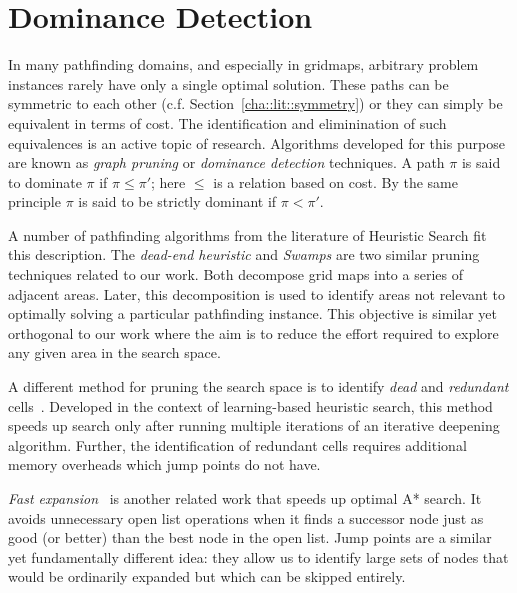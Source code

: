 \section{Dominance Detection}
\label{cha::lit::dominance}
In many pathfinding domains, and especially in gridmaps, arbitrary problem instances rarely
have only a single optimal solution. These paths can be symmetric to each other 
(c.f. Section~\ref{cha::lit::symmetry}) or they can simply be equivalent in terms of cost. 
The identification and eliminination of such equivalences is an active topic of research.
Algorithms developed for this purpose are known as \emph{graph pruning} or 
\emph{dominance detection} techniques. A path $\pi$ is said to dominate $\pi$ if 
$\pi \leq \pi'$; here $\leq$ is a relation based on cost. By the same principle $\pi$ is 
said to be strictly dominant if $\pi < \pi'$. 

A number of pathfinding algorithms from the literature of Heuristic Search fit this 
description. The \emph{dead-end heuristic} \cite{bjornsson06} and \emph{Swamps} \cite{pochter10}
are two similar pruning techniques related to our work.
Both decompose grid maps into a series of adjacent areas. Later, this decomposition
is used to identify areas not relevant to optimally solving a particular
pathfinding instance.
This objective is similar yet orthogonal to our work where
the aim is to reduce the effort required to explore any given area in the search
space.

A different method for pruning the search space is to identify \emph{dead} and
\emph{redundant} cells~\cite{sturtevant10b}.  Developed in the context of
learning-based heuristic search, this method speeds up search only after running
multiple iterations of an iterative deepening algorithm.  Further, the
identification of redundant cells requires additional memory overheads which
jump points do not have.

\emph{Fast expansion}~\cite{sun09} is another related work that speeds up
optimal A* search. It avoids unnecessary open list operations when it finds a
successor node just as good (or better) than the best node in the open list.
Jump points are a similar yet fundamentally different idea: they allow us to
identify large sets of nodes that would be ordinarily expanded but which can be
skipped entirely.
